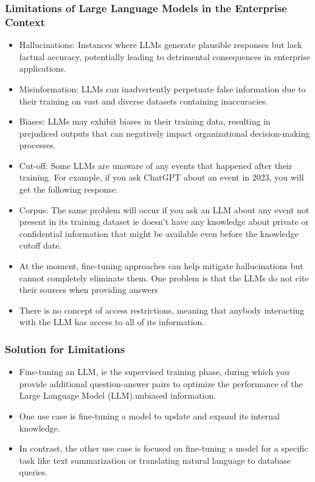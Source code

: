 \begin{frame}[fragile]\frametitle{Limitations of Large Language Models in the Enterprise Context}

\begin{itemize}
\item Hallucinations: Instances where LLMs generate plausible responses but lack factual accuracy, potentially leading to detrimental consequences in enterprise applications.
\item Misinformation: LLMs can inadvertently perpetuate false information due to their training on vast and diverse datasets containing inaccuracies.
\item Biases: LLMs may exhibit biases in their training data, resulting in prejudiced outputs that can negatively impact organizational decision-making processes.
\item Cut-off: Some LLMs are unaware of any events that happened after their training. For example, if you ask ChatGPT about an event in 2023, you will get the following response.
\item Corpus: The same problem will occur if you ask an LLM about any event not present in its training dataset ie doesn’t have any knowledge about private or confidential information that might be available even before the knowledge cutoff date.
\item At the moment, fine-tuning approaches can help mitigate hallucinations but cannot completely eliminate them. One problem is that the LLMs do not cite their sources when providing answers
\item There is no concept of access restrictions, meaning that anybody interacting with the LLM has access to all of its information.
\end{itemize}	

\end{frame}

\begin{frame}[fragile]\frametitle{Solution for Limitations}

\begin{itemize}
\item Fine-tuning an LLM, ie the supervised training phase, during which you provide additional question-answer pairs to optimize the performance of the Large Language Model (LLM).unbiased information.
\item One use case is fine-tuning a model to update and expand its internal knowledge.
\item In contrast, the other use case is focused on fine-tuning a model for a specific task like text summarization or translating natural language to database queries.
\end{itemize}	

\end{frame}


